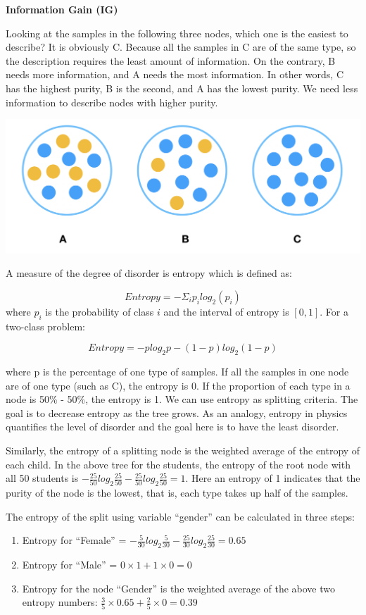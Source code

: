 \documentclass[
  12pt,
]{krantz}
\providecommand{\tightlist}{%
  \setlength{\itemsep}{0pt}\setlength{\parskip}{0pt}}
\begin{document}
\textbf{Information Gain (IG)}

Looking at the samples in the following three nodes, which one is the easiest to describe? It is obviously C. Because all the samples in C are of the same type, so the description requires the least amount of information. On the contrary, B needs more information, and A needs the most information. In other words, C has the highest purity, B is the second, and A has the lowest purity. We need less information to describe nodes with higher purity.

\includegraphics{images/InfoGainEN.PNG}

A measure of the degree of disorder is entropy which is defined as:

\[Entropy = - \Sigma_i p_i log_2(p_i)\]
where \(p_i\) is the probability of class \(i\) and the interval of entropy is \([0, 1]\). For a two-class problem:

\[Entropy=-plog_{2}p-(1-p)log_{2}(1-p)\]

where p is the percentage of one type of samples. If all the samples in one node are of one type (such as C), the entropy is 0. If the proportion of each type in a node is 50\% - 50\%, the entropy is 1. We can use entropy as splitting criteria. The goal is to decrease entropy as the tree grows. As an analogy, entropy in physics quantifies the level of disorder and the goal here is to have the least disorder.

Similarly, the entropy of a splitting node is the weighted average of the entropy of each child. In the above tree for the students, the entropy of the root node with all 50 students is \(-\frac{25}{50}log_{2}\frac{25}{50}-\frac{25}{50}log_{2}\frac{25}{50}=1\). Here an entropy of 1 indicates that the purity of the node is the lowest, that is, each type takes up half of the samples.

The entropy of the split using variable ``gender'' can be calculated in three steps:

\begin{enumerate}
\def\labelenumi{\arabic{enumi}.}
\tightlist
\item
  Entropy for ``Female'' = \(-\frac{5}{30}log_{2}\frac{5}{30}-\frac{25}{30}log_{2}\frac{25}{30}=0.65\)
\item
  Entropy for ``Male'' = \(0\times1+1\times 0=0\)
\item
  Entropy for the node ``Gender'' is the weighted average of the above two entropy numbers: \(\frac{3}{5}\times 0.65+\frac{2}{5}\times 0=0.39\)
\end{enumerate}
\end{document}
